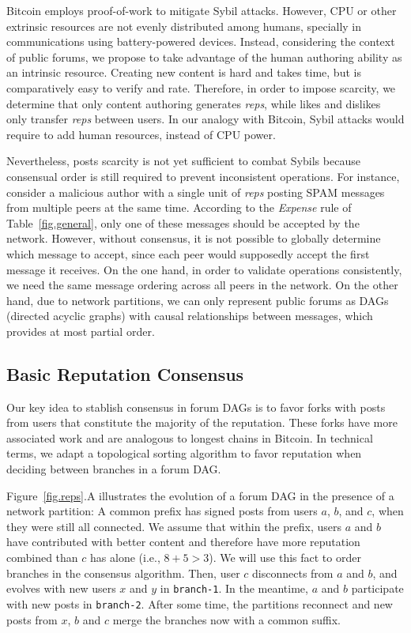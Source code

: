 \documentclass[12pt]{article}
\newcommand{\reps}     {\emph{reps}\xspace}
\newcommand{\code}[1]  {\texttt{\footnotesize{#1}}}
\begin{document}
Bitcoin employs proof-of-work to mitigate Sybil attacks.
However, CPU or other extrinsic resources are not evenly distributed among
humans, specially in communications using battery-powered devices.
%
Instead, considering the context of public forums, we propose to take advantage
of the human authoring ability as an intrinsic resource.
Creating new content is hard and takes time, but is comparatively easy to
verify and rate.
Therefore, in order to impose scarcity, we determine that only content
authoring generates \reps, while likes and dislikes only transfer \reps between
users.
In our analogy with Bitcoin, Sybil attacks would require to add human resources,
instead of CPU power.

Nevertheless, posts scarcity is not yet sufficient to combat Sybils because
consensual order is still required to prevent inconsistent operations.
For instance, consider a malicious author with a single unit of \reps posting
SPAM messages from multiple peers at the same time.
According to the \emph{Expense} rule of Table~\ref{fig.general}, only one of
these messages should be accepted by the network.
However, without consensus, it is not possible to globally determine which
message to accept, since each peer would supposedly accept the first message it
receives.
On the one hand, in order to validate operations consistently, we need the same
message ordering across all peers in the network.
On the other hand, due to network partitions, we can only represent public
forums as DAGs (directed acyclic graphs) with causal relationships between
messages, which provides at most partial order.

\subsection{Basic Reputation Consensus}
\label{sec.design.basic}

Our key idea to stablish consensus in forum DAGs is to favor forks with posts
from users that constitute the majority of the reputation.
These forks have more associated work and are analogous to longest chains in
Bitcoin.
%
In technical terms, we adapt a topological sorting algorithm to favor
reputation when deciding between branches in a forum DAG.

Figure~\ref{fig.reps}.A illustrates the evolution of a forum DAG in the
presence of a network partition:
A common prefix has signed posts from users $a$, $b$, and $c$, when they were
still all connected.
%
We assume that within the prefix, users $a$ and $b$ have contributed with
better content and therefore have more reputation combined than $c$ has alone
(i.e., $8+5>3$).
We will use this fact to order branches in the consensus algorithm.
%
Then, user $c$ disconnects from $a$ and $b$, and evolves with new users $x$ and
$y$ in \code{branch-1}.
In the meantime, $a$ and $b$ participate with new posts in \code{branch-2}.
After some time, the partitions reconnect and new posts from $x$, $b$ and $c$
merge the branches now with a common suffix.
\end{document}
